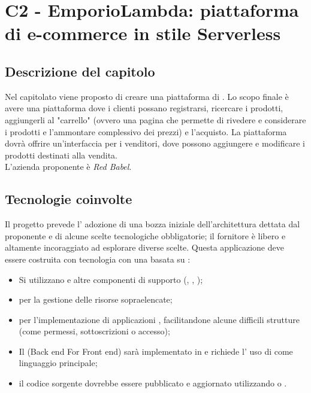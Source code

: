 \section{C2 - EmporioLambda: piattaforma di e-commerce in stile Serverless}

\subsection{Descrizione del capitolo}
Nel capitolato viene proposto di creare una piattaforma di .
Lo scopo finale è avere una piattaforma dove i clienti possano registrarsi, ricercare i prodotti, aggiungerli al "carrello" (ovvero una pagina che permette di rivedere e considerare i prodotti e l'ammontare complessivo dei prezzi) e l'acquisto. La piattaforma dovrà offrire un'interfaccia per i venditori, dove possono aggiungere e modificare i prodotti destinati alla vendita.\\
L'azienda proponente è \textit{Red Babel}.

\subsection{Tecnologie coinvolte}
Il progetto prevede l' adozione di una bozza iniziale dell'architettura dettata dal proponente e di alcune scelte tecnologiche obbligatorie; il fornitore è libero e altamente incoraggiato ad esplorare diverse scelte.
Questa applicazione deve essere costruita con tecnologia  con una  basata su :
\begin{itemize}
\item	Si utilizzano   e altre componenti di supporto (, , );
\item	{} per la gestione delle risorse sopraelencate;
\item	{} per l’implementazione di applicazioni , facilitandone alcune difficili strutture (come permessi, sottoscrizioni o accesso);
\item	Il (Back end For Front end) sarà implementato in  e richiede l' uso di  come linguaggio principale;
\item	il codice sorgente dovrebbe essere pubblicato e aggiornato utilizzando  o .
\end{itemize}

